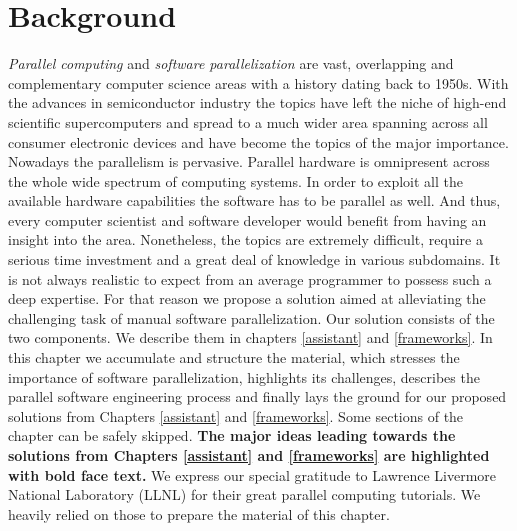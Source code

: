 \chapter{Background}
\label{background}


\quad \textit{Parallel computing} and \textit{software parallelization} are vast, overlapping and complementary computer science areas with a history dating back to 1950s. With the advances in semiconductor industry the topics have left the niche of high-end scientific supercomputers and spread to a much wider area spanning across all consumer electronic devices and have become the topics of the major importance.\newline\null
\quad Nowadays the parallelism is pervasive. Parallel hardware is omnipresent across the whole wide spectrum of computing systems. In order to exploit all the available hardware capabilities the software has to be parallel as well. And thus, every computer scientist and software developer would benefit from having an insight into the area. Nonetheless, the topics are extremely difficult, require a serious time investment and a great deal of knowledge in various subdomains. It is not always realistic to expect from an average programmer to possess such a deep expertise. For that reason we propose a solution aimed at alleviating the challenging task of manual software parallelization. Our solution consists of the two components. We describe them in chapters \ref{assistant} and \ref{frameworks}.\newline\null
\quad In this chapter we accumulate and structure the material, which stresses the importance of software parallelization, highlights its challenges, describes the parallel software engineering process and finally lays the ground for our proposed solutions from Chapters \ref{assistant} and \ref{frameworks}. Some sections of the chapter can be safely skipped. \textbf{The major ideas leading towards the solutions from Chapters \ref{assistant} and \ref{frameworks} are highlighted with bold face text.} We express our special gratitude to Lawrence Livermore National Laboratory (LLNL) \cite{llnl_computing} for their great parallel computing tutorials. We heavily relied on those to prepare the material of this chapter.\newline\null
